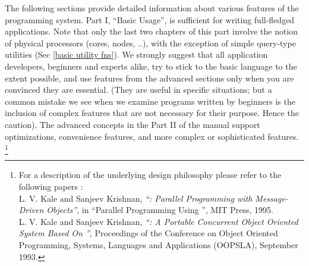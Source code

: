 The following sections provide detailed information about various features of the
\charm programming system. Part I, ``Basic Usage'', is sufficient
for writing full-fledged applications. Note that only the last two
chapters of this part involve the notion of physical processors
(cores, nodes, ..), with the exception of simple query-type utilities
(Sec \ref{basic utility fns}). We strongly suggest that all
application developers, beginners and experts alike, try to stick to
the basic language to the extent possible, and use features from the
advanced sections only when you are convinced they are
essential. (They are useful in specific situations; but a common
mistake we see when we examine programs written by beginners is the
inclusion of complex features that are not necessary for their
purpose. Hence the caution). The advanced concepts in the Part II of
the manual support optimizations, convenience features, and more
complex or sophisticated features. \footnote{For a description of the underlying design
philosophy please refer to the following papers :\\
    L. V. Kale and Sanjeev Krishnan,
    {\em ``\charm : Parallel Programming with Message-Driven Objects''},
    in ``Parallel Programming Using \CC'',
    MIT Press, 1995. \\
    L. V. Kale and Sanjeev Krishnan,
    {\em ``\charm : A Portable Concurrent Object Oriented System
    Based On \CC''},
    Proceedings of the Conference on Object Oriented Programming,
    Systems, Languages and Applications (OOPSLA), September 1993.
}
